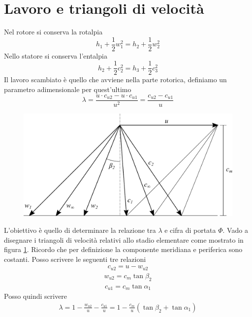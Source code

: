 \section{Lavoro e triangoli di velocità}
Nel rotore si conserva la rotalpia
\begin{equation}
h_1 + \frac{1}{2} w_1^2 = h_2 + \frac{1}{2} w_2^2
\end{equation}
Nello statore si conserva l'entalpia
\begin{equation}
h_2 + \frac{1}{2} c_2^2 = h_3 + \frac{1}{2} c_3^2
\end{equation}
Il lavoro scambiato è quello che avviene nella parte rotorica, definiamo un parametro adimensionale per quest'ultimo
\begin{equation}
\lambda = \frac{u \cdot c_{u2} - u \cdot c_{u1}}{u^2} = \frac{c_{u2} - c_{u1}}{u}
\end{equation}
\begin{figure}
\centering
  \includegraphics[width=.8\textwidth]{fig/triangComp.pdf}
\caption{}
\label{fig:triangComp}
\end{figure}
L'obiettivo è quello di determinare la relazione tra $\lambda$ e cifra di portata $\Phi$. Vado a disegnare i triangoli di velocità relativi allo stadio elementare come mostrato in figura \ref{fig:triangComp}. Ricordo che per definizione la componente meridiana e periferica sono costanti. Posso scrivere le seguenti tre relazioni 
\begin{align*}
c_{u2} = u - w_{u2}
\end{align*}
\begin{align*}
w_{u2} = c_m \tan \beta_2
\end{align*}
\begin{align*}
c_{u1} = c_m \tan \alpha_1
\end{align*}
Posso quindi scrivere
\begin{align*}
\lambda = 1- \frac{w_{u2}}{u} - \frac{c_{u1}}{u} = 1 - \frac{c_m}{u} \left(\tan \beta_2 + \tan \alpha_1 \right)
\end{align*}
